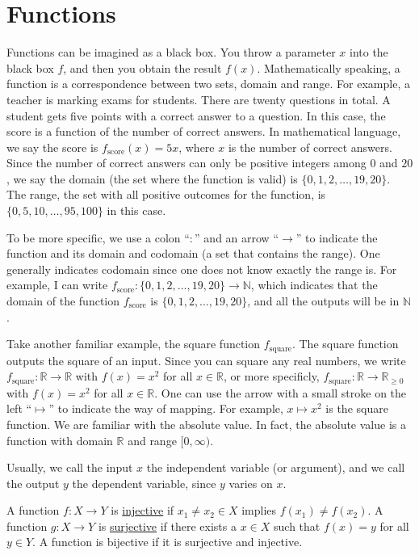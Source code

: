 \documentclass[11pt]{book}
\theoremstyle{break}
\theoremstyle{no_label}
\newcommand{\bbR}{\mathbb{R}}
\newcommand{\bbN}{\mathbb{N}}
\numberwithin{equation}{section}
\begin{document}
\section{Functions}

Functions can be imagined as a black box. You throw a parameter $x$ into the black box $f$, and then you obtain the result $f(x)$. Mathematically speaking, a function is a correspondence between two sets, domain and range. For example, a teacher is marking exams for students. There are twenty questions in total. A student gets five points with a correct answer to a question. In this case, the score is a function of the number of correct answers. In mathematical language, we say the score is $f_{\text{score}}(x)=5x$, where $x$ is the number of correct answers. Since the number of correct answers can only be positive integers among $0$ and $20$, we say the domain (the set where the function is valid) is $\{0, 1, 2, \dots, 19, 20\}$. The range, the set with all positive outcomes for the function, is $\{0, 5, 10, \dots, 95, 100\}$ in this case.

To be more specific, we use a colon ``$:$'' and an arrow ``$\to$'' to indicate the function and its domain and codomain (a set that contains the range). One generally indicates codomain since one does not know exactly the range is. For example, I can write $f_{\text{score}}:\{0, 1, 2, \dots, 19, 20\}\to\bbN$, which indicates that the domain of the function $f_{\text{score}}$ is $\{0, 1, 2, \dots, 19, 20\}$, and all the outputs will be in $\bbN$.

Take another familiar example, the square function $f_{\text{square}}$. The square function outputs the square of an input. Since you can square any real numbers, we write $f_{\text{square}}:\bbR\to\bbR$ with $f(x)=x^2$ for all $x\in\bbR$, or more specificly, $f_{\text{square}}:\bbR\to\bbR_{\geq0}$ with $f(x)=x^2$ for all $x\in\bbR$. One can use the arrow with a small stroke on the left ``$\mapsto$'' to indicate the way of mapping. For example, $x\mapsto x^2$ is the square function. We are familiar with the absolute value. In fact, the absolute value is a function with domain $\bbR$ and range $[0, \infty)$.

Usually, we call the input $x$ the independent variable (or argument), and we call the output $y$ the dependent variable, since $y$ varies on $x$.

\begin{definition}
    A function $f:X\to Y$ is \underline{injective} if $x_1\ne x_2\in X$ implies $f(x_1)\ne f(x_2)$. A function $g:X\to Y$ is \underline{surjective} if there exists a $x\in X$ such that $f(x)=y$ for all $y\in Y$. A function is bijective if it is surjective and injective.
\end{definition}
\end{document}

